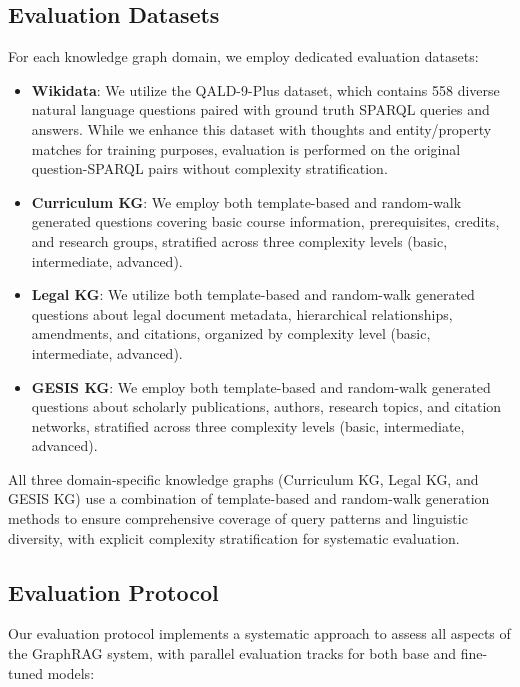 \subsection{Evaluation Datasets}
For each knowledge graph domain, we employ dedicated evaluation datasets:

\begin{itemize}
    \item \textbf{Wikidata}: We utilize the QALD-9-Plus dataset, which contains 558 diverse natural language questions paired with ground truth SPARQL queries and answers. While we enhance this dataset with thoughts and entity/property matches for training purposes, evaluation is performed on the original question-SPARQL pairs without complexity stratification.
    
    \item \textbf{Curriculum KG}: We employ both template-based and random-walk generated questions covering basic course information, prerequisites, credits, and research groups, stratified across three complexity levels (basic, intermediate, advanced).
    
    \item \textbf{Legal KG}: We utilize both template-based and random-walk generated questions about legal document metadata, hierarchical relationships, amendments, and citations, organized by complexity level (basic, intermediate, advanced).
    
    \item \textbf{GESIS KG}: We employ both template-based and random-walk generated questions about scholarly publications, authors, research topics, and citation networks, stratified across three complexity levels (basic, intermediate, advanced).
\end{itemize}

All three domain-specific knowledge graphs (Curriculum KG, Legal KG, and GESIS KG) use a combination of template-based and random-walk generation methods to ensure comprehensive coverage of query patterns and linguistic diversity, with explicit complexity stratification for systematic evaluation.

\subsection{Evaluation Protocol}
Our evaluation protocol implements a systematic approach to assess all aspects of the GraphRAG system, with parallel evaluation tracks for both base and fine-tuned models:

